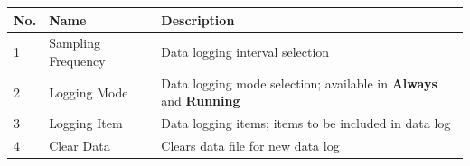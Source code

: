 \begin{longtable}[]{@{}|l|l|l|@{}}
\toprule
\rowcolor{brown}\begin{minipage}[b]{0.04\columnwidth}\raggedright
{\bf{No.}}\strut
\end{minipage} & \begin{minipage}[b]{0.23\columnwidth}\raggedright
{\bf{Name}}\strut
\end{minipage} & \begin{minipage}[b]{0.65\columnwidth}\raggedright
{\bf{Description}}\strut
\end{minipage}\tabularnewline
\midrule
\endhead
\begin{minipage}[t]{0.04\columnwidth}\raggedright
1\strut
\end{minipage} & \begin{minipage}[t]{0.23\columnwidth}\raggedright
Sampling Frequency\strut
\end{minipage} & \begin{minipage}[t]{0.65\columnwidth}\raggedright
Data logging interval selection\strut
\end{minipage}\tabularnewline
\begin{minipage}[t]{0.04\columnwidth}\raggedright
2\strut
\end{minipage} & \begin{minipage}[t]{0.23\columnwidth}\raggedright
Logging Mode\strut
\end{minipage} & \begin{minipage}[t]{0.65\columnwidth}\raggedright
Data logging mode selection; available in \textbf{Always} and
\textbf{Running}\strut
\end{minipage}\tabularnewline
\begin{minipage}[t]{0.04\columnwidth}\raggedright
3\strut
\end{minipage} & \begin{minipage}[t]{0.23\columnwidth}\raggedright
Logging Item\strut
\end{minipage} & \begin{minipage}[t]{0.65\columnwidth}\raggedright
Data logging items; items to be included in data log\strut
\end{minipage}\tabularnewline
\begin{minipage}[t]{0.04\columnwidth}\raggedright
4\strut
\end{minipage} & \begin{minipage}[t]{0.23\columnwidth}\raggedright
Clear Data\strut
\end{minipage} & \begin{minipage}[t]{0.65\columnwidth}\raggedright
Clears data file for new data log\strut
\end{minipage}\tabularnewline
\bottomrule
\end{longtable}

